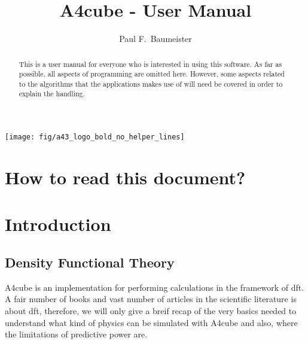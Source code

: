 \documentclass[oribibl]{llncs}
\newcommand{\codename}{A4cube}
\begin{document}
\pagestyle{plain}

\title       {\codename{} - User Manual}
\titlerunning{\codename{}}

\author{%
  Paul F.~Baumeister %
}


\maketitle

\begin{figure*}
	\centering
	\texttt{[image: fig/a43\_logo\_bold\_no\_helper\_lines]} %
\end{figure*}

\begin{abstract}
This is a user manual for everyone who is interested in using
this software.
As far as possible, all aspects of programming are omitted here.
However, some aspects related to the algorithms that the applications 
makes use of will need be covered in order to explain the handling.
\end{abstract}

\section*{How to read this document?}

\newpage
\section{Introduction} \label{sec:intro}
%
\subsection{Density Functional Theory}
\codename{} is an implementation for performing calculations in the framework of \ac{dft}.
A fair number of books and vast number of articles in the scientific 
literature is about \ac{dft}, therefore, we will only give a breif recap 
of the very basics needed to understand what kind of physics can be
simulated with \codename{} and also, where the limitations of predictive power
are.
\end{document}

